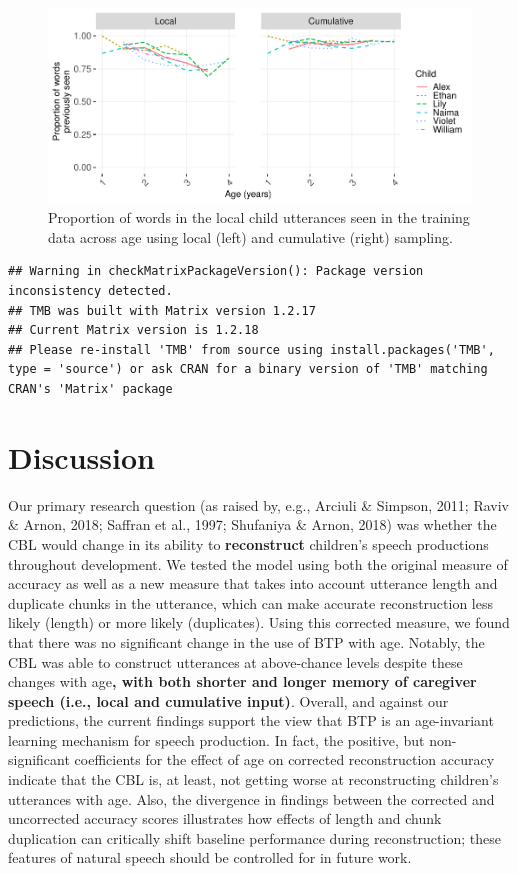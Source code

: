 \documentclass[
  english,
  man,mask,floatsintext]{apa6}
\begin{document}
\begin{figure}
\includegraphics[width=0.95\linewidth]{CBL-age_invariance_files/figure-latex/fig7-1} \caption{Proportion of words in the local child utterances seen in the training data across age using local (left) and cumulative (right) sampling.}\label{fig:fig7}
\end{figure}

\begin{verbatim}
## Warning in checkMatrixPackageVersion(): Package version inconsistency detected.
## TMB was built with Matrix version 1.2.17
## Current Matrix version is 1.2.18
## Please re-install 'TMB' from source using install.packages('TMB', type = 'source') or ask CRAN for a binary version of 'TMB' matching CRAN's 'Matrix' package
\end{verbatim}

\hypertarget{discussion}{%
\section{Discussion}\label{discussion}}

Our primary research question (as raised by, e.g., Arciuli \& Simpson, 2011; Raviv \& Arnon, 2018; Saffran et al., 1997; Shufaniya \& Arnon, 2018) was whether the CBL would change in its ability to \textbf{reconstruct} children's speech productions throughout development. We tested the model using both the original measure of accuracy as well as a new measure that takes into account utterance length and duplicate chunks in the utterance, which can make accurate reconstruction less likely (length) or more likely (duplicates). Using this corrected measure, we found that there was no significant change in the use of BTP with age. Notably, the CBL was able to construct utterances at above-chance levels despite these changes with age\textbf{, with both shorter and longer memory of caregiver speech (i.e., local and cumulative input)}. Overall, and against our predictions, the current findings support the view that BTP is an age-invariant learning mechanism for speech production. In fact, the positive, but non-significant coefficients for the effect of age on corrected reconstruction accuracy indicate that the CBL is, at least, not getting worse at reconstructing children's utterances with age. Also, the divergence in findings between the corrected and uncorrected accuracy scores illustrates how effects of length and chunk duplication can critically shift baseline performance during reconstruction; these features of natural speech should be controlled for in future work.
\end{document}
